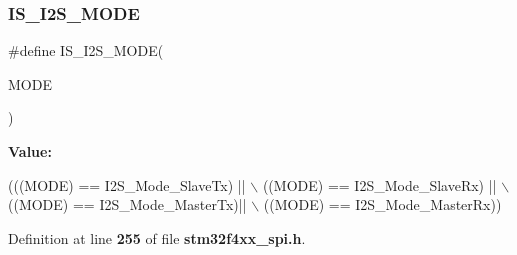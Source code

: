 \subsubsection{I\+S\+\_\+\+I2\+S\+\_\+\+M\+O\+DE}
{\footnotesize\ttfamily \#define I\+S\+\_\+\+I2\+S\+\_\+\+M\+O\+DE(\begin{DoxyParamCaption}\item[{}]{M\+O\+DE }\end{DoxyParamCaption})}

{\bfseries Value\+:}
\begin{DoxyCode}
(((MODE) == I2S_Mode_SlaveTx) || \(\backslash\)
                           ((MODE) == I2S_Mode_SlaveRx) || \(\backslash\)
                           ((MODE) == I2S_Mode_MasterTx)|| \(\backslash\)
                           ((MODE) == I2S_Mode_MasterRx))
\end{DoxyCode}


Definition at line \textbf{ 255} of file \textbf{ stm32f4xx\+\_\+spi.\+h}.

